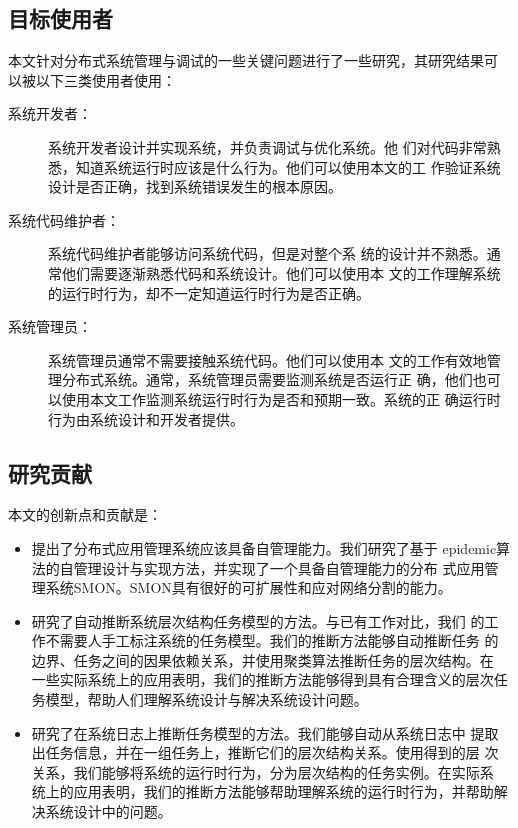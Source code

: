\subsection{目标使用者}

本文针对分布式系统管理与调试的一些关键问题进行了一些研究，其研究结果可
以被以下三类使用者使用：

\begin{description}

  \item[系统开发者：] 系统开发者设计并实现系统，并负责调试与优化系统。他
  们对代码非常熟悉，知道系统运行时应该是什么行为。他们可以使用本文的工
  作验证系统设计是否正确，找到系统错误发生的根本原因。

  \item[系统代码维护者：] 系统代码维护者能够访问系统代码，但是对整个系
  统的设计并不熟悉。通常他们需要逐渐熟悉代码和系统设计。他们可以使用本
  文的工作理解系统的运行时行为，却不一定知道运行时行为是否正确。

  \item[系统管理员：] 系统管理员通常不需要接触系统代码。他们可以使用本
  文的工作有效地管理分布式系统。通常，系统管理员需要监测系统是否运行正
  确，他们也可以使用本文工作监测系统运行时行为是否和预期一致。系统的正
  确运行时行为由系统设计和开发者提供。

\end{description}

\subsection{研究贡献}

本文的创新点和贡献是：

\begin{itemize}

  \item 提出了分布式应用管理系统应该具备自管理能力。我们研究了基于
  epidemic算法的自管理设计与实现方法，并实现了一个具备自管理能力的分布
  式应用管理系统SMON。SMON具有很好的可扩展性和应对网络分割的能力。

  \item 研究了自动推断系统层次结构任务模型的方法。与已有工作对比，我们
  的工作不需要人手工标注系统的任务模型。我们的推断方法能够自动推断任务
  的边界、任务之间的因果依赖关系，并使用聚类算法推断任务的层次结构。在
  一些实际系统上的应用表明，我们的推断方法能够得到具有合理含义的层次任
  务模型，帮助人们理解系统设计与解决系统设计问题。

  \item 研究了在系统日志上推断任务模型的方法。我们能够自动从系统日志中
  提取出任务信息，并在一组任务上，推断它们的层次结构关系。使用得到的层
  次关系，我们能够将系统的运行时行为，分为层次结构的任务实例。在实际系
  统上的应用表明，我们的推断方法能够帮助理解系统的运行时行为，并帮助解
  决系统设计中的问题。

\end{itemize}

